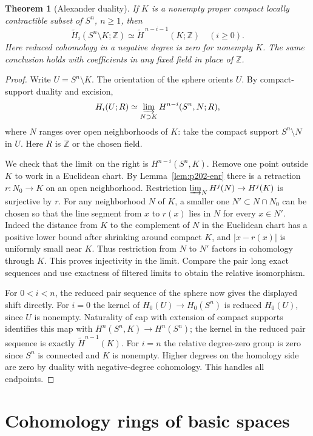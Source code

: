 \documentclass[11pt,oneside,openany]{book}
\theoremstyle{plain}
\newtheorem{theorem}{Theorem}[chapter]
\theoremstyle{definition}
\theoremstyle{remark}
\newcommand{\Z}{\mathbb Z}
\begin{document}
\begin{theorem}[Alexander duality]\label{thm:p202-alexander}
If \(K\) is a nonempty proper compact locally contractible
subset of \(S^n\), \(n\geq1\), then
\[
 \widetilde H_i(S^n\setminus K;\mathbb Z)
   \simeq \widetilde H^{\,n-i-1}(K;\mathbb Z)
 \quad(i\geq0).
\]
Here reduced cohomology in a negative degree is zero for
nonempty \(K\). The same conclusion holds with coefficients in
any fixed field in place of \(\Z\).
\end{theorem}
\begin{proof}
Write \(U=S^n\setminus K\). The orientation of the sphere
orients \(U\). By compact-support duality and excision,
\[
 H_i(U;R)\simeq
 \varinjlim_{N\supset K} H^{n-i}(S^n,N;R),
\]
where \(N\) ranges over open neighborhoods of \(K\):
take the compact support \(S^n\setminus N\) in \(U\).
Here \(R\) is \(\Z\) or the chosen field.

We check that the limit on the right is \(H^{n-i}(S^n,K)\).
Remove one point outside \(K\) to work in a Euclidean chart.
By Lemma~\ref{lem:p202-enr} there is a retraction
\(r:N_0\to K\) on an open neighborhood. Restriction
\(\varinjlim_N H^j(N)\to H^j(K)\) is surjective by \(r\).
For any neighborhood \(N\) of \(K\), a smaller one
\(N'\subset N\cap N_0\) can be chosen so that the line
segment from \(x\) to \(r(x)\) lies in \(N\) for every
\(x\in N'\). Indeed the distance from \(K\) to the
complement of \(N\) in the Euclidean chart has a positive
lower bound after shrinking around compact \(K\), and
\(\lvert x-r(x)\rvert\) is uniformly small near \(K\).
Thus restriction from \(N\) to \(N'\) factors in
cohomology through \(K\). This proves injectivity in the
limit. Compare the pair long exact sequences and use
exactness of filtered limits to obtain the relative
isomorphism.

For \(0<i<n\), the reduced pair sequence of the sphere
now gives the displayed shift directly. For \(i=0\) the
kernel of \(H_0(U)\to H_0(S^n)\) is reduced \(H_0(U)\),
since \(U\) is nonempty. Naturality of cap with extension
of compact supports identifies this map with
\(H^n(S^n,K)\to H^n(S^n)\); the kernel in the reduced
pair sequence is exactly \(\widetilde H^{n-1}(K)\).
For \(i=n\) the relative degree-zero group is zero
since \(S^n\) is connected and \(K\) is nonempty.
Higher degrees on the homology side are zero by duality
with negative-degree cohomology. This handles all endpoints.
\end{proof}

\section{Cohomology rings of basic spaces}\label{p202:T28}
\end{document}
